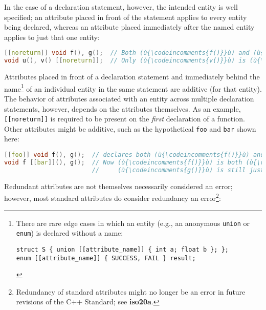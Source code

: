 In the case of a declaration statement, however, the intended entity is
well specified; an attribute placed in front of the statement applies to
every entity being declared, whereas an attribute placed immediately
after the named entity applies to just that one entity:

\begin{lstlisting}[language=C++]
[[noreturn]] void f(), g();  // Both (ù{\codeincomments{f()}}ù) and (ù{\codeincomments{g()}}ù) are (ù{\codeincomments{noreturn}}ù).
void u(), v() [[noreturn]];  // Only (ù{\codeincomments{v()}}ù) is (ù{\codeincomments{noreturn}}ù).
\end{lstlisting}
    
\noindent Attributes placed in front of a declaration statement and immediately
behind the name{\cprotect\footnote{There are rare edge cases in which an
entity (e.g., an anonymous \texttt{union} or \texttt{enum}) is
declared without a name:

\begin{lstlisting}[style=footcode]
struct S { union [[attribute_name]] { int a; float b }; };
enum [[attribute_name]] { SUCCESS, FAIL } result;
\end{lstlisting} \vspace*{-1ex}
      }} of an individual entity in the same statement are additive (for
that entity). The behavior of attributes associated with an entity
across multiple declaration statements, however, depends on the
attributes themselves. As an example, \texttt{[[noreturn]]} is required
to be present on the \emph{first} declaration of a function. Other
attributes might be additive, such as the hypothetical \texttt{foo} and
\texttt{bar} shown here:

\begin{lstlisting}[language=C++]
[[foo]] void f(), g();  // declares both (ù{\codeincomments{f()}}ù) and (ù{\codeincomments{g()}}ù) to be (ù{\codeincomments{foo}}ù)
void f [[bar]](), g();  // Now (ù{\codeincomments{f()}}ù) is both (ù{\codeincomments{foo}}ù) and (ù{\codeincomments{bar}}ù) while
                        //     (ù{\codeincomments{g()}}ù) is still just (ù{\codeincomments{foo}}ù).
\end{lstlisting}
\pagebreak%

\noindent Redundant attributes are not themselves necessarily considered an error;
however, most standard attributes do consider redundancy an
error{\cprotect\footnote{Redundancy of standard
attributes might no longer be an error in future revisions of the
  C++ Standard; see \textbf{{iso20a}}.}}:

